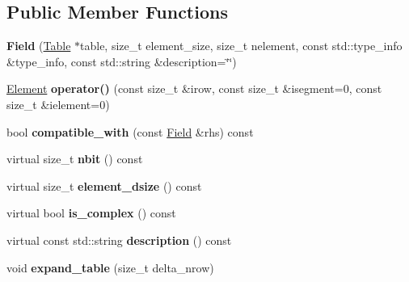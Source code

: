 \subsection*{Public Member Functions}
\begin{DoxyCompactItemize}
\item 
{\bfseries Field} (\hyperlink{classTable}{Table} $\ast$table, size\+\_\+t element\+\_\+size, size\+\_\+t nelement, const std\+::type\+\_\+info \&type\+\_\+info, const std\+::string \&description=\char`\"{}\char`\"{})\hypertarget{classField_a99a8a91be12a04cfbf796655d1bdc43d}{}\label{classField_a99a8a91be12a04cfbf796655d1bdc43d}

\item 
\hyperlink{classElement}{Element} {\bfseries operator()} (const size\+\_\+t \&irow, const size\+\_\+t \&isegment=0, const size\+\_\+t \&ielement=0)\hypertarget{classField_aec27d013e8544087b0aafa457f5c366e}{}\label{classField_aec27d013e8544087b0aafa457f5c366e}

\item 
bool {\bfseries compatible\+\_\+with} (const \hyperlink{classField}{Field} \&rhs) const \hypertarget{classField_aebde47e87596764d7862ed15e4e5985d}{}\label{classField_aebde47e87596764d7862ed15e4e5985d}

\item 
virtual size\+\_\+t {\bfseries nbit} () const \hypertarget{classField_ace43d6bf3c0d9daeda885e6c0341daba}{}\label{classField_ace43d6bf3c0d9daeda885e6c0341daba}

\item 
virtual size\+\_\+t {\bfseries element\+\_\+dsize} () const \hypertarget{classField_a8fd3669ef9680dd50c7d2fb861fbd758}{}\label{classField_a8fd3669ef9680dd50c7d2fb861fbd758}

\item 
virtual bool {\bfseries is\+\_\+complex} () const \hypertarget{classField_ab058d452a9187782ff3d32bbf4155e21}{}\label{classField_ab058d452a9187782ff3d32bbf4155e21}

\item 
virtual const std\+::string {\bfseries description} () const \hypertarget{classField_a08330e74f21963329bbcdd2609b5d77e}{}\label{classField_a08330e74f21963329bbcdd2609b5d77e}

\item 
void {\bfseries expand\+\_\+table} (size\+\_\+t delta\+\_\+nrow)\hypertarget{classField_a8f260d0da4c9c1cb9d3b34dac14379b5}{}\label{classField_a8f260d0da4c9c1cb9d3b34dac14379b5}


\end{DoxyCompactItemize}
